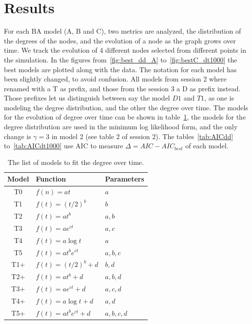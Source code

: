 \documentclass[a4paper]{article}
\begin{document}
\section{Results} %
%
For each BA model (A, B and C), two metrics are analyzed, the distribution of 
the degrees of the nodes, and the evolution of a node as the graph grows over 
time.  We track the evolution of 4 different nodes selected from different 
points in the simulation. In the figures from~\ref{fig:best_dd_A} 
to~\ref{fig:bestC_dt1000} the best models are plotted along with the data. The 
notation for each model has been slightly changed, to avoid confusion. All 
models from session 2 where renamed with a T as prefix, and those from the 
session 3 a D as prefix instead. Those prefixes let us distinguish between say 
the model $D1$ and $T1$, as one is modeling the degree distribution, and the 
other the degree over time. The models for the evolution of degree over time can 
be shown in table~\ref{tab:Tmodels}, the models for the degree distribution are 
used in the minimum log likelihood form, and the only change is $\gamma = 3 $ in 
model 2 (see table 2 of session 2).
%
The tables~\ref{tab:AICdd} to~\ref{tab:AICdt1000} use AIC to
measure $\Delta = AIC - AIC_{best}$ of each model.
%
\begin{table}[H]
	\centering
	\begin{tabular}{cll}
		\toprule
		Model & Function & Parameters\\
		\midrule
		T0  & $f(n) = at$								& $a$ \\
		T1  & $f(t) = (t/2)^b$					& $b$ \\
		T2  & $f(t) = at^b$ 						& $a,b$\\
		T3  & $f(t) = ae^{ct}$					& $a,c$\\
		T4  & $f(t) = a\log t$					& $a$\\
		T5  & $f(t) = at^be^{ct}$				& $a,b,c$\\
		T1+ & $f(t) = (t/2)^b + d$			& $b,d$\\
		T2+ & $f(t) = at^b + d$					& $a,b,d$\\
		T3+ & $f(t) = ae^{ct} + d$			& $a,c,d$\\
		T4+ & $f(t) = a\log t + d$			& $a,d$\\
		T5+ & $f(t) = at^be^{ct} + d$	& $a,b,c,d$\\
		\bottomrule
	\end{tabular}
	\caption{The list of models to fit the degree over time.}
	\label{tab:Tmodels}
\end{table}
\end{document}
